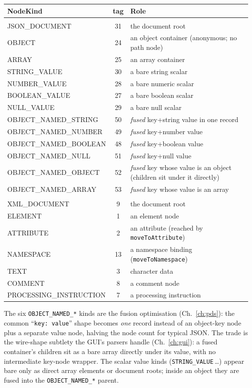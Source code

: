 \documentclass[11pt,a4paper,oneside]{report}
\theoremstyle{sirixthm}
\newcommand{\code}[1]{\texttt{#1}}
\begin{document}
{\small
\begin{xltabular}{\linewidth}{@{}>{\ttfamily\small}p{0.265\textwidth} c >{\RaggedRight\arraybackslash}X@{}}
\toprule
\textnormal{\textbf{NodeKind}} & \textbf{tag} & \textbf{Role}\\
\midrule
\endhead
{}\\
JSON\_DOCUMENT & 31 & the document root\\
OBJECT & 24 & an object container (anonymous; no path node)\\
ARRAY & 25 & an array container\\
STRING\_VALUE & 30 & a bare string scalar\\
NUMBER\_VALUE & 28 & a bare numeric scalar\\
BOOLEAN\_VALUE & 27 & a bare boolean scalar\\
NULL\_VALUE & 29 & a bare null scalar\\
OBJECT\_NAMED\_STRING & 50 & \emph{fused} key{+}string value in one record\\
OBJECT\_NAMED\_NUMBER & 49 & \emph{fused} key{+}number value\\
OBJECT\_NAMED\_BOOLEAN & 48 & \emph{fused} key{+}boolean value\\
OBJECT\_NAMED\_NULL & 51 & \emph{fused} key{+}null value\\
OBJECT\_NAMED\_OBJECT & 52 & \emph{fused} key whose value is an object (children sit under it directly)\\
OBJECT\_NAMED\_ARRAY & 53 & \emph{fused} key whose value is an array\\
\midrule
{}\\
XML\_DOCUMENT & 9 & the document root\\
ELEMENT & 1 & an element node\\
ATTRIBUTE & 2 & an attribute (reached by \code{moveToAttribute})\\
NAMESPACE & 13 & a namespace binding (\code{moveToNamespace})\\
TEXT & 3 & character data\\
COMMENT & 8 & a comment node\\
PROCESSING\_INSTRUCTION & 7 & a processing instruction\\
\bottomrule
\end{xltabular}}

\noindent The six \code{OBJECT\_NAMED\_*} kinds are the fusion optimisation
(Ch.~\ref{ch:pds}): the common ``\code{key: value}'' shape becomes \emph{one} record instead of an
object-key node plus a separate value node, halving the node count for typical JSON. The trade is the
wire-shape subtlety the GUI's parsers handle (Ch.~\ref{ch:gui}): a fused container's children sit as a
bare array directly under its value, with no intermediate key-node wrapper. The scalar value kinds
(\code{STRING\_VALUE}\,\ldots) appear bare only as direct array elements or document roots; inside an
object they are fused into the \code{OBJECT\_NAMED\_*} parent.
\end{document}
